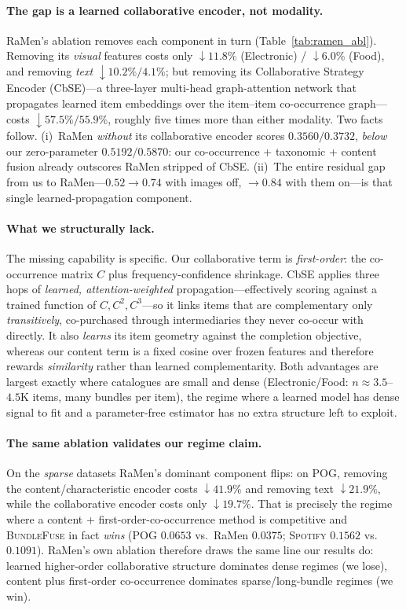 \paragraph{The gap is a learned collaborative encoder, not modality.} RaMen's ablation removes each component in
turn (Table~\ref{tab:ramen_abl}). Removing its \emph{visual} features costs only $\downarrow\!11.8\%$ (Electronic)
/ $\downarrow\!6.0\%$ (Food), and removing \emph{text} $\downarrow\!10.2\%/4.1\%$; but removing its Collaborative
Strategy Encoder (CbSE)---a three-layer multi-head graph-attention network that propagates learned item embeddings
over the item--item co-occurrence graph---costs $\downarrow\!57.5\%/55.9\%$, roughly five times more than either
modality. Two facts follow. (i)~RaMen \emph{without} its collaborative encoder scores $0.3560/0.3732$, \emph{below}
our zero-parameter $0.5192/0.5870$: our co-occurrence + taxonomic + content fusion already outscores RaMen stripped
of CbSE. (ii)~The entire residual gap from us to RaMen---$0.52\!\to\!0.74$ with images off, $\to\!0.84$ with them
on---is that single learned-propagation component.

\paragraph{What we structurally lack.} The missing capability is specific. Our collaborative term is
\emph{first-order}: the co-occurrence matrix $C$ plus frequency-confidence shrinkage. CbSE applies three hops of
\emph{learned, attention-weighted} propagation---effectively scoring against a trained function of $C, C^2, C^3$---so
it links items that are complementary only \emph{transitively}, co-purchased through intermediaries they never
co-occur with directly. It also \emph{learns} its item geometry against the completion objective, whereas our content
term is a fixed cosine over frozen features and therefore rewards \emph{similarity} rather than learned
complementarity. Both advantages are largest exactly where catalogues are small and dense (Electronic/Food:
$n\!\approx\!3.5$--$4.5$K items, many bundles per item), the regime where a learned model has dense signal to fit and
a parameter-free estimator has no extra structure left to exploit.

\paragraph{The same ablation validates our regime claim.} On the \emph{sparse} datasets RaMen's dominant component
flips: on \textsc{POG}, removing the content/characteristic encoder costs $\downarrow\!41.9\%$ and removing text
$\downarrow\!21.9\%$, while the collaborative encoder costs only $\downarrow\!19.7\%$. That is precisely the regime
where a content + first-order-co-occurrence method is competitive and \textsc{BundleFuse} in fact \emph{wins}
(\textsc{POG} $0.0653$ vs.\ RaMen $0.0375$; \textsc{Spotify} $0.1562$ vs.\ $0.1091$). RaMen's own ablation therefore
draws the same line our results do: learned higher-order collaborative structure dominates dense regimes (we lose),
content plus first-order co-occurrence dominates sparse/long-bundle regimes (we win).


